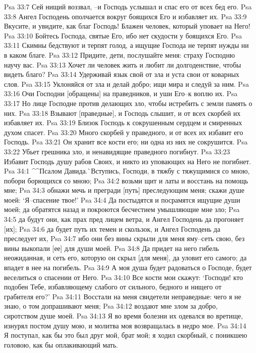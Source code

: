 Psa 33:7  Сей нищий воззвал, --и Господь услышал и спас его от всех бед его.
Psa 33:8  Ангел Господень ополчается вокруг боящихся Его и избавляет их.
Psa 33:9  Вкусите, и увидите, как благ Господь! Блажен человек, который уповает на Него!
Psa 33:10  Бойтесь Господа, святые Его, ибо нет скудости у боящихся Его.
Psa 33:11  Скимны бедствуют и терпят голод, а ищущие Господа не терпят нужды ни в каком благе.
Psa 33:12  Придите, дети, послушайте меня: страху Господню научу вас.
Psa 33:13  Хочет ли человек жить и любит ли долгоденствие, чтобы видеть благо?
Psa 33:14  Удерживай язык свой от зла и уста свои от коварных слов.
Psa 33:15  Уклоняйся от зла и делай добро; ищи мира и следуй за ним.
Psa 33:16  Очи Господни [обращены] на праведников, и уши Его--к воплю их.
Psa 33:17  Но лице Господне против делающих зло, чтобы истребить с земли память о них.
Psa 33:18  Взывают [праведные], и Господь слышит, и от всех скорбей их избавляет их.
Psa 33:19  Близок Господь к сокрушенным сердцем и смиренных духом спасет.
Psa 33:20  Много скорбей у праведного, и от всех их избавит его Господь.
Psa 33:21  Он хранит все кости его; ни одна из них не сокрушится.
Psa 33:22  Убьет грешника зло, и ненавидящие праведного погибнут.
Psa 33:23  Избавит Господь душу рабов Своих, и никто из уповающих на Него не погибнет.
Psa 34:1  ^^Псалом Давида.^^ Вступись, Господи, в тяжбу с тяжущимися со мною, побори борющихся со мною;
Psa 34:2  возьми щит и латы и восстань на помощь мне;
Psa 34:3  обнажи мечь и прегради [путь] преследующим меня; скажи душе моей: `Я--спасение твое!'
Psa 34:4  Да постыдятся и посрамятся ищущие души моей; да обратятся назад и покроются бесчестием умышляющие мне зло;
Psa 34:5  да будут они, как прах пред лицем ветра, и Ангел Господень да прогоняет [их];
Psa 34:6  да будет путь их темен и скользок, и Ангел Господень да преследует их,
Psa 34:7  ибо они без вины скрыли для меня яму--сеть свою, без вины выкопали [ее] для души моей.
Psa 34:8  Да придет на него гибель неожиданная, и сеть его, которую он скрыл [для меня], да уловит его самого; да впадет в нее на погибель.
Psa 34:9  А моя душа будет радоваться о Господе, будет веселиться о спасении от Него.
Psa 34:10  Все кости мои скажут: `Господи! кто подобен Тебе, избавляющему слабого от сильного, бедного и нищего от грабителя его?'
Psa 34:11  Восстали на меня свидетели неправедные: чего я не знаю, о том допрашивают меня;
Psa 34:12  воздают мне злом за добро, сиротством душе моей.
Psa 34:13  Я во время болезни их одевался во вретище, изнурял постом душу мою, и молитва моя возвращалась в недро мое.
Psa 34:14  Я поступал, как бы это был друг мой, брат мой; я ходил скорбный, с поникшею головою, как бы оплакивающий мать.
